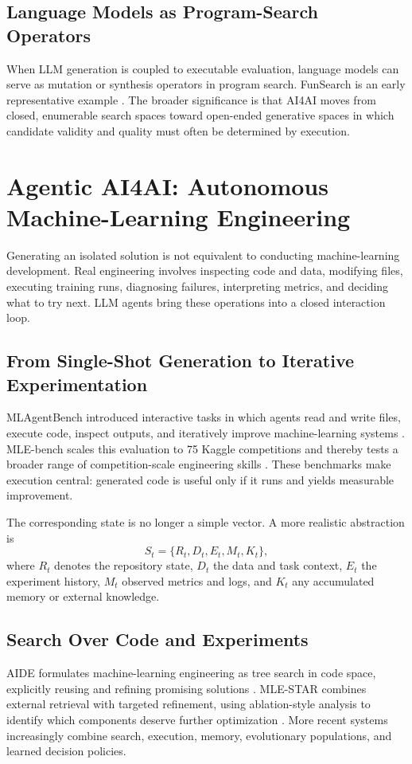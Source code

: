 \documentclass[journal]{IEEEtran}
\begin{document}
\subsection{Language Models as Program-Search Operators}
When LLM generation is coupled to executable evaluation, language models can serve as mutation or synthesis operators in program search. FunSearch is an early representative example \cite{romeraparedes2024funsearch}. The broader significance is that AI4AI moves from closed, enumerable search spaces toward open-ended generative spaces in which candidate validity and quality must often be determined by execution.

\section{Agentic AI4AI: Autonomous Machine-Learning Engineering}
\label{sec:mleagents}

Generating an isolated solution is not equivalent to conducting machine-learning development. Real engineering involves inspecting code and data, modifying files, executing training runs, diagnosing failures, interpreting metrics, and deciding what to try next. LLM agents bring these operations into a closed interaction loop.

\subsection{From Single-Shot Generation to Iterative Experimentation}
MLAgentBench introduced interactive tasks in which agents read and write files, execute code, inspect outputs, and iteratively improve machine-learning systems \cite{huang2024mlagentbench}. MLE-bench scales this evaluation to 75 Kaggle competitions and thereby tests a broader range of competition-scale engineering skills \cite{chan2025mlebench}. These benchmarks make execution central: generated code is useful only if it runs and yields measurable improvement.

The corresponding state is no longer a simple vector. A more realistic abstraction is
\begin{equation}
S_t = \{R_t,D_t,E_t,M_t,K_t\},
\end{equation}
where $R_t$ denotes the repository state, $D_t$ the data and task context, $E_t$ the experiment history, $M_t$ observed metrics and logs, and $K_t$ any accumulated memory or external knowledge.

\subsection{Search Over Code and Experiments}
AIDE formulates machine-learning engineering as tree search in code space, explicitly reusing and refining promising solutions \cite{jiang2025aide}. MLE-STAR combines external retrieval with targeted refinement, using ablation-style analysis to identify which components deserve further optimization \cite{nam2025mlestar}. More recent systems increasingly combine search, execution, memory, evolutionary populations, and learned decision policies.
\end{document}
